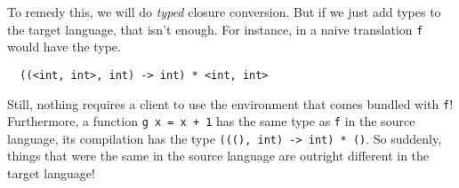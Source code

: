 \documentclass[11pt]{article}
\newcommand{\code}{\texttt}
\begin{document}
To remedy this, we will do \emph{typed} closure conversion. But if we just add
types to the target language, that isn't enough. For instance, in a naive
translation \code{f} would have the type.

\begin{lstlisting}
  ((<int, int>, int) -> int) * <int, int>
\end{lstlisting}

Still, nothing requires a client to use the environment that comes bundled with
\code{f}! Furthermore, a function \code{g x = x + 1} has the same type as
\code{f} in the source language, its compilation has the type
\code{(((), int) -> int) * ()}. So suddenly, things that were the same in the
source language are outright different in the target language!
\end{document}
